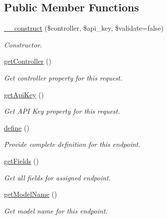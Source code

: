 \subsection*{Public Member Functions}
\begin{DoxyCompactItemize}
\item 
\hyperlink{classTune_1_1Management_1_1Endpoints_1_1TuneManagementBase_ac90167e0eac8fc6eabb2c8a6b5e76f2d}{\-\_\-\-\_\-construct} (\$controller, \$api\-\_\-key, \$validate=false)
\begin{DoxyCompactList}\small\item\em Constructor. \end{DoxyCompactList}\item 
\hyperlink{classTune_1_1Management_1_1Endpoints_1_1TuneManagementBase_a4c8a498adcaefcf062be5c0df908b322}{get\-Controller} ()
\begin{DoxyCompactList}\small\item\em Get controller property for this request. \end{DoxyCompactList}\item 
\hyperlink{classTune_1_1Management_1_1Endpoints_1_1TuneManagementBase_a5c45e8f0538a67a3153cb16d799056cb}{get\-Api\-Key} ()
\begin{DoxyCompactList}\small\item\em Get A\-P\-I Key property for this request. \end{DoxyCompactList}\item 
\hyperlink{classTune_1_1Management_1_1Endpoints_1_1TuneManagementBase_a03a788525dd9f8f4d2cdc4c3f3a71a43}{define} ()
\begin{DoxyCompactList}\small\item\em Provide complete definition for this endpoint. \end{DoxyCompactList}\item 
\hyperlink{classTune_1_1Management_1_1Endpoints_1_1TuneManagementBase_a90622e8a1a2e1838e83d3c5f1295e92b}{get\-Fields} ()
\begin{DoxyCompactList}\small\item\em Get all fields for assigned endpoint. \end{DoxyCompactList}\item 
\hyperlink{classTune_1_1Management_1_1Endpoints_1_1TuneManagementBase_a4ad7c50f77d4e728fd168c0958d4df92}{get\-Model\-Name} ()
\begin{DoxyCompactList}\small\item\em Get model name for this endpoint. \end{DoxyCompactList}\item 

\end{DoxyCompactItemize}
